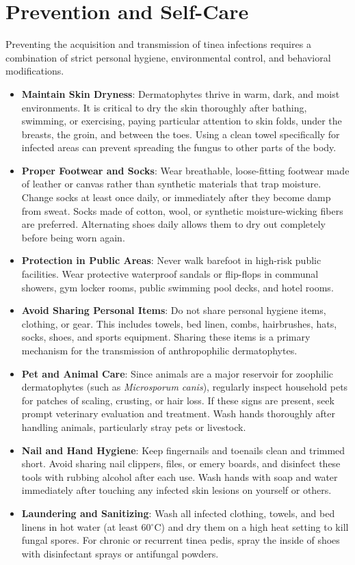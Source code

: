 \section*{Prevention and Self-Care}
Preventing the acquisition and transmission of tinea infections requires a combination of strict personal hygiene, environmental control, and behavioral modifications.
\begin{itemize}
    \item \textbf{Maintain Skin Dryness}: Dermatophytes thrive in warm, dark, and moist environments. It is critical to dry the skin thoroughly after bathing, swimming, or exercising, paying particular attention to skin folds, under the breasts, the groin, and between the toes. Using a clean towel specifically for infected areas can prevent spreading the fungus to other parts of the body.
    \item \textbf{Proper Footwear and Socks}: Wear breathable, loose-fitting footwear made of leather or canvas rather than synthetic materials that trap moisture. Change socks at least once daily, or immediately after they become damp from sweat. Socks made of cotton, wool, or synthetic moisture-wicking fibers are preferred. Alternating shoes daily allows them to dry out completely before being worn again.
    \item \textbf{Protection in Public Areas}: Never walk barefoot in high-risk public facilities. Wear protective waterproof sandals or flip-flops in communal showers, gym locker rooms, public swimming pool decks, and hotel rooms.
    \item \textbf{Avoid Sharing Personal Items}: Do not share personal hygiene items, clothing, or gear. This includes towels, bed linen, combs, hairbrushes, hats, socks, shoes, and sports equipment. Sharing these items is a primary mechanism for the transmission of anthropophilic dermatophytes.
    \item \textbf{Pet and Animal Care}: Since animals are a major reservoir for zoophilic dermatophytes (such as \textit{Microsporum canis}), regularly inspect household pets for patches of scaling, crusting, or hair loss. If these signs are present, seek prompt veterinary evaluation and treatment. Wash hands thoroughly after handling animals, particularly stray pets or livestock.
    \item \textbf{Nail and Hand Hygiene}: Keep fingernails and toenails clean and trimmed short. Avoid sharing nail clippers, files, or emery boards, and disinfect these tools with rubbing alcohol after each use. Wash hands with soap and water immediately after touching any infected skin lesions on yourself or others.
    \item \textbf{Laundering and Sanitizing}: Wash all infected clothing, towels, and bed linens in hot water (at least 60$^\circ$C) and dry them on a high heat setting to kill fungal spores. For chronic or recurrent tinea pedis, spray the inside of shoes with disinfectant sprays or antifungal powders.
\end{itemize}

